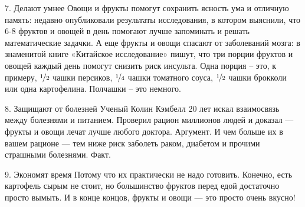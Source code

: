 7. Делают умнее Овощи и фрукты помогут сохранить ясность ума и отличную память: недавно опубликовали результаты исследования, в котором выяснили, что 6-8 фруктов и овощей в день помогают лучше запоминать и решать математические задачки. А еще фрукты и овощи спасают от заболеваний мозга: в знаменитой книге «Китайское исследование» пишут, что три порции фруктов и овощей каждый день помогут снизить риск инсульта. Одна порция -- это, к примеру, $\nicefrac{1}{2}$ чашки персиков, $\nicefrac{1}{4}$ чашки томатного соуса, $\nicefrac{1}{2}$ чашки брокколи или одна картофелина. Полчашки -- это немного. 

8. Защищают от болезней Ученый Колин Кэмбелл 20 лет искал взаимосвязь между болезнями и питанием. Проверил рацион миллионов людей и доказал — фрукты и овощи лечат лучше любого доктора. Аргумент. И чем больше их в вашем рационе — тем ниже риск заболеть раком, диабетом и прочими страшными болезнями. Факт. 

9. Экономят время Потому что их практически не надо готовить. Конечно, есть картофель сырым не стоит, но большинство фруктов перед едой достаточно просто вымыть. И в конце концов, фрукты и овощи — это просто очень вкусно!


